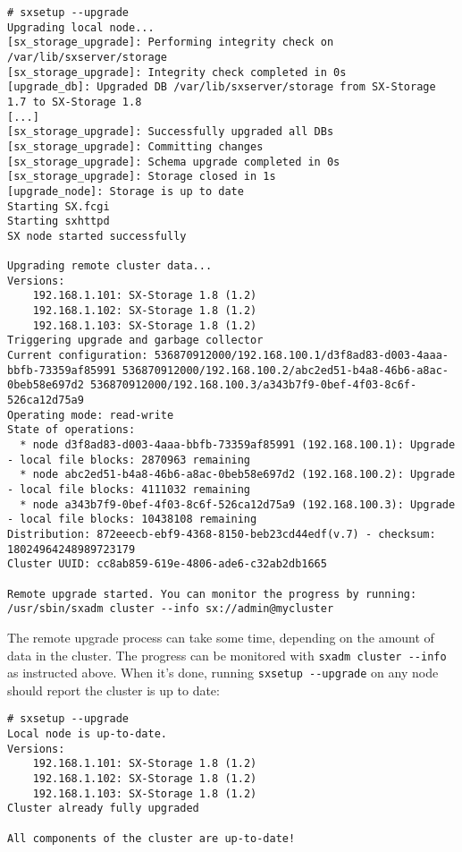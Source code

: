 \begin{lstlisting}
# sxsetup --upgrade
Upgrading local node...
[sx_storage_upgrade]: Performing integrity check on /var/lib/sxserver/storage
[sx_storage_upgrade]: Integrity check completed in 0s
[upgrade_db]: Upgraded DB /var/lib/sxserver/storage from SX-Storage 1.7 to SX-Storage 1.8
[...]
[sx_storage_upgrade]: Successfully upgraded all DBs
[sx_storage_upgrade]: Committing changes
[sx_storage_upgrade]: Schema upgrade completed in 0s
[sx_storage_upgrade]: Storage closed in 1s
[upgrade_node]: Storage is up to date
Starting SX.fcgi
Starting sxhttpd
SX node started successfully

Upgrading remote cluster data...
Versions:
    192.168.1.101: SX-Storage 1.8 (1.2)
    192.168.1.102: SX-Storage 1.8 (1.2)
    192.168.1.103: SX-Storage 1.8 (1.2)
Triggering upgrade and garbage collector
Current configuration: 536870912000/192.168.100.1/d3f8ad83-d003-4aaa-bbfb-73359af85991 536870912000/192.168.100.2/abc2ed51-b4a8-46b6-a8ac-0beb58e697d2 536870912000/192.168.100.3/a343b7f9-0bef-4f03-8c6f-526ca12d75a9
Operating mode: read-write
State of operations:
  * node d3f8ad83-d003-4aaa-bbfb-73359af85991 (192.168.100.1): Upgrade - local file blocks: 2870963 remaining
  * node abc2ed51-b4a8-46b6-a8ac-0beb58e697d2 (192.168.100.2): Upgrade - local file blocks: 4111032 remaining
  * node a343b7f9-0bef-4f03-8c6f-526ca12d75a9 (192.168.100.3): Upgrade - local file blocks: 10438108 remaining
Distribution: 872eeecb-ebf9-4368-8150-beb23cd44edf(v.7) - checksum: 18024964248989723179
Cluster UUID: cc8ab859-619e-4806-ade6-c32ab2db1665

Remote upgrade started. You can monitor the progress by running:
/usr/sbin/sxadm cluster --info sx://admin@mycluster
\end{lstlisting}
The remote upgrade process can take some time, depending on the amount of
data in the cluster. The progress can be monitored with
\verb+sxadm cluster --info+ as instructed above. When it's done, running
\verb+sxsetup --upgrade+ on any node should report the cluster is up to date:
\begin{lstlisting}
# sxsetup --upgrade
Local node is up-to-date.
Versions:
    192.168.1.101: SX-Storage 1.8 (1.2)
    192.168.1.102: SX-Storage 1.8 (1.2)
    192.168.1.103: SX-Storage 1.8 (1.2)
Cluster already fully upgraded

All components of the cluster are up-to-date!
\end{lstlisting}
